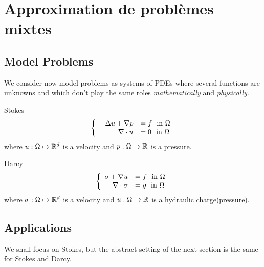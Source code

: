 \usepackage{beamerarticle}

\chapter{Approximation de problèmes mixtes}
\label{cha:appr-de-probl-1}

\section{Model Problems}
\label{sec:model-problems}

  We consider now model problems as systems of PDEs where several functions are
  unknowns and which don't play the same roles \emph{mathematically} and
  \emph{physically}.
  \begin{problem}{Stokes}
    \begin{equation}
      \label{eq:chmixte:98}
      \left\{\begin{array}[c]{rl}
          -\Delta u + \nabla p & = f\ \mbox{ in } \Omega\\
          \nabla \cdot u & = 0\ \mbox{ in } \Omega
        \end{array}\right.
    \end{equation}
    where $u: \Omega \mapsto \mathbb R^{d}$ is a velocity and $p: \Omega \mapsto \mathbb R^{}$
    is a pressure.
  \end{problem}
  \begin{problem}{Darcy}
    \begin{equation}
      \label{eq:chmixte:99}
      \left\{\begin{array}[c]{rl}
          \sigma + \nabla u & = f\ \mbox{ in } \Omega\\
          \nabla \cdot \sigma & = g\ \mbox{ in } \Omega
        \end{array}\right.
    \end{equation}
    where $\sigma: \Omega \mapsto \mathbb R^{d}$ is a velocity and $u: \Omega \mapsto \mathbb R^{}$
    is a hydraulic charge(pressure).

  \end{problem}


\section{Applications}

  We shall focus on Stokes, but the abstract setting of the next section is
  the same for Stokes and Darcy.

